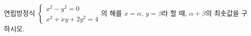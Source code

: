 연립방정식 $\begin{cases} x^2-y^2=0 \\ x^2+xy+2y^2=4 \end{cases}$의 해를 $x=\alpha$, $y=\beta$라 할 때, $\alpha+\beta$의 최솟값을 구하시오.
